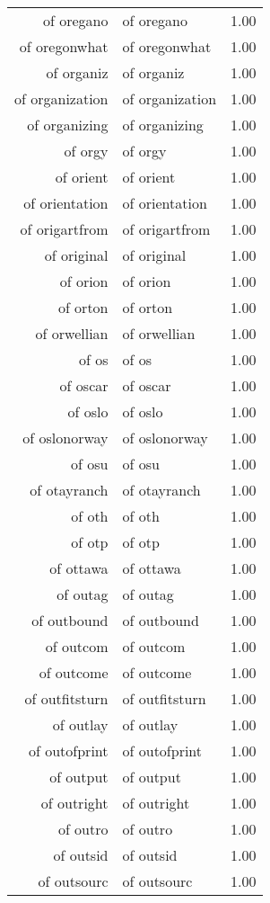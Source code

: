 \begin{table}[ht]
\begin{tabular}{rlr}
  of oregano & of oregano & 1.00 \\ 
  of oregonwhat & of oregonwhat & 1.00 \\ 
  of organiz & of organiz & 1.00 \\ 
  of organization & of organization & 1.00 \\ 
  of organizing & of organizing & 1.00 \\ 
  of orgy & of orgy & 1.00 \\ 
  of orient & of orient & 1.00 \\ 
  of orientation & of orientation & 1.00 \\ 
  of origartfrom & of origartfrom & 1.00 \\ 
  of original & of original & 1.00 \\ 
  of orion & of orion & 1.00 \\ 
  of orton & of orton & 1.00 \\ 
  of orwellian & of orwellian & 1.00 \\ 
  of os & of os & 1.00 \\ 
  of oscar & of oscar & 1.00 \\ 
  of oslo & of oslo & 1.00 \\ 
  of oslonorway & of oslonorway & 1.00 \\ 
  of osu & of osu & 1.00 \\ 
  of otayranch & of otayranch & 1.00 \\ 
  of oth & of oth & 1.00 \\ 
  of otp & of otp & 1.00 \\ 
  of ottawa & of ottawa & 1.00 \\ 
  of outag & of outag & 1.00 \\ 
  of outbound & of outbound & 1.00 \\ 
  of outcom & of outcom & 1.00 \\ 
  of outcome & of outcome & 1.00 \\ 
  of outfitsturn & of outfitsturn & 1.00 \\ 
  of outlay & of outlay & 1.00 \\ 
  of outofprint & of outofprint & 1.00 \\ 
  of output & of output & 1.00 \\ 
  of outright & of outright & 1.00 \\ 
  of outro & of outro & 1.00 \\ 
  of outsid & of outsid & 1.00 \\ 
  of outsourc & of outsourc & 1.00 \\ 

\end{tabular}
\end{table}
